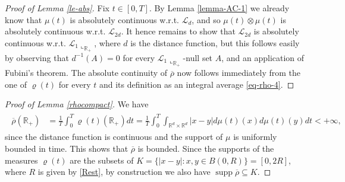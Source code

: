 \documentclass[A4paper,11pt]{article}
\theoremstyle{definition}
\newcommand{\R}{\mathbb{R}}
\newcommand{\cl}{\mathcal{L}}
\DeclareMathOperator{\supp}{supp}
\newcommand{\prerho}{\overline\rho}
\begin{document}
\begin{proof}[Proof of Lemma \ref{le-abs}]
	Fix $t\in [0,T]$. By Lemma \ref{lemma-AC-1} we already know that $\mu(t)$ is absolutely continuous w.r.t.
	$\cl_d$, and so $\mu(t)\otimes\mu(t)$ is absolutely continuous w.r.t. $\cl_{2d}$. It hence
	remains to show that $\cl_{2d}$ is absolutely continuous w.r.t. $\cl_1\llcorner_{\R_+}$, where $d$ is the distance function,
	but this follows easily by observing that $d^{-1}(A)=0$ for every $\cl_1\llcorner_{\R_+}$-null set $A$, and an application of Fubini's theorem.	
	The absolute continuity of $\prerho$ now follows immediately from the one of $\varrho(t)$ for every $t$ and its
	definition as an integral average \eqref{eq-rho-4}.
\end{proof}


\begin{proof}[Proof of Lemma \ref{rhocompact}]
We have
\begin{align*}
\begin{split}
\prerho(\R_+)&= \frac{1}{T}\int_0^T \varrho(t)(\R_+)dt 
= \frac{1}{T}\int_0^T \int_{\R^d \times \R^d} |x - y| d\mu(t)(x) d \mu(t)(y)dt
<+\infty,
\end{split}
\end{align*}
since the distance function is continuous and the support of $\mu$ is uniformly bounded in time. This shows that $\prerho$ is bounded.
Since the supports of the measures $\varrho(t)$ are the subsets of
$K=\{|x-y|:x,y\in B(0,R)\} = [0,2R]$, where $R$ is given by \eqref{Rest}, by construction we also have $\supp \prerho\subseteq K$.
\end{proof}
\end{document}
